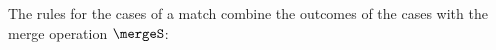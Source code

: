 The rules for the cases of a match combine the outcomes of the cases with the merge operation $\mergeS$:
\begin{mathpar}

\end{mathpar}
